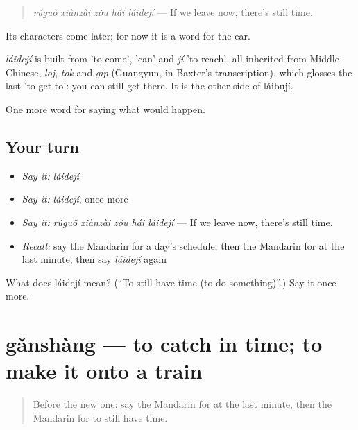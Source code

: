 \begin{quote}
\emph{rúguǒ xiànzài zǒu hái láidejí} — If we leave now, there's still time.
\end{quote}

Its characters come later; for now it is a word for the ear.

\begin{cousinweb}
\emph{láidejí} is built from  'to come',  'can' and \emph{jí} 'to reach', all inherited from Middle Chinese, \emph{loj}, \emph{tok} and \emph{gip} (Guangyun, in Baxter's transcription), which glosses the last 'to get to': you can still get there. It is the other side of láibují.
\end{cousinweb}

\begin{grammarlens}[title={What you've built}]
One more word for saying what would happen.
\end{grammarlens}

\subsection*{Your turn}
\begin{itemize}
\raggedright
  \item \emph{Say it:} \emph{láidejí}
  \item \emph{Say it:} \emph{láidejí}, once more
  \item \emph{Say it:} \emph{rúguǒ xiànzài zǒu hái láidejí} — If we leave now, there's still time.
  \item \emph{Recall:} say the Mandarin for a day's schedule, then the Mandarin for at the last minute, then say \emph{láidejí} again
\end{itemize}

\begin{tcolorbox}[breakable,colback=teal!4,colframe=teal!35!black,title={Before you move on}]
What does láidejí mean? (\textquotedblleft{}To still have time (to do something)\textquotedblright{}.) Say it once more.
\end{tcolorbox}
\section[gǎnshàng]{gǎnshàng — to catch in time; to make it onto a train}

\label{lesson:ZH-C391-ganshang}



\begin{quote}
Before the new one: say the Mandarin for at the last minute, then the Mandarin for to still have time.
\end{quote}

